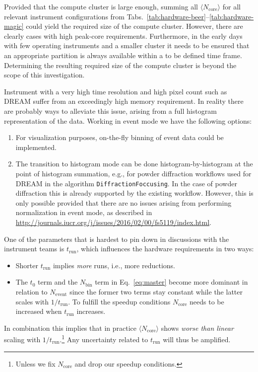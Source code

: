 \documentclass[a4paper,english,numbers=noenddot,bibliography=totoc,chapterprefix=on,DIV=12]{scrartcl}
\newcommand{\Trun}{t_{\text{run}}}
\newcommand{\Nbin}{N_{\text{bin}}}
\newcommand{\Ncore}{N_{\text{core}}}
\newcommand{\Ncoremean}{\langle N_{\text{core}}\rangle}
\newcommand{\Nevent}{N_{\text{event}}}
\newcommand{\dream}{DREAM\xspace}
\begin{document}
Provided that the compute cluster is large enough, summing all $\Ncoremean$ for all relevant instrument configurations from Tabs.~\ref{tab:hardware-beer}--\ref{tab:hardware-magic} could yield the required size of the compute cluster.
However, there are clearly cases with high peak-core requirements.
Furthermore, in the early days with few operating instruments and a smaller cluster it needs to be ensured that an appropriate partition is always available within a to be defined time frame.
Determining the resulting required size of the compute cluster is beyond the scope of this investigation.

Instrument with a very high time resolution and high pixel count such as \dream suffer from an exceedingly high memory requirement.
In reality there are probably ways to alleviate this issue, arising from a full histogram representation of the data.
Working in event mode we have the following options:
\begin{enumerate}
  \item For visualization purposes, on-the-fly binning of event data could be implemented.
  \item The transition to histogram mode can be done histogram-by-histogram at the point of histogram summation, e.g., for powder diffraction workflows used for \dream in the algorithm \verb|DiffractionFoccusing|.
    In the case of powder diffraction this is already supported by the existing workflow.
    However, this is only possible provided that there are no issues arising from performing normalization in event mode, as described in \url{http://journals.iucr.org/j/issues/2016/02/00/fs5119/index.html}.
\end{enumerate}

One of the parameters that is hardest to pin down in discussions with the instrument teams is $\Trun$, which influences the hardware requirements in two ways:
\begin{itemize}
  \item Shorter $\Trun$ implies \emph{more} runs, i.e., more reductions.
  \item The $t_0$ term and the $\Nbin$ term in Eq.~\eqref{eq:master} become more dominant in relation to $\Nevent$ since the former two terms stay constant while the latter scales with $1/\Trun$.
    To fulfill the speedup conditions $\Ncore$ needs to be increased when $\Trun$ increases.
\end{itemize}
In combination this implies that in practice $\Ncoremean$ shows \emph{worse than linear} scaling with $1/\Trun$.\footnote{Unless we fix $\Ncore$ and drop our speedup conditions.}
Any uncertainty related to $\Trun$ will thus be amplified.
\end{document}

